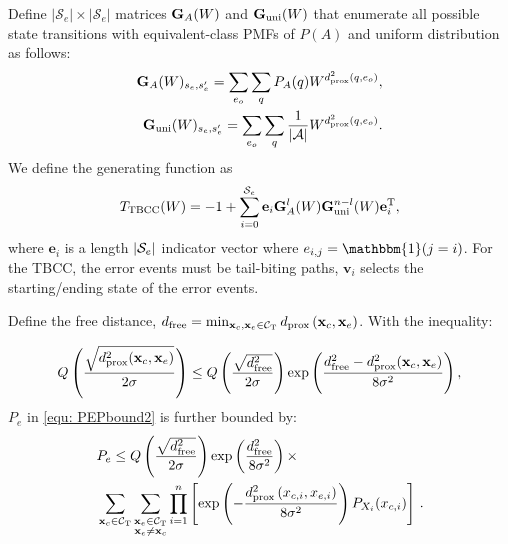 \documentclass [PhD] {uclathes}
\begin{document}
Define $|\mathcal{S}_e|\times|\mathcal{S}_e|$ matrices $\mathbf{G}_A(W)$ and $\mathbf{G}_{\text{uni}}(W)$ that enumerate all possible state transitions with equivalent-class PMFs of  $P(A)$ and uniform distribution as follows:
\begin{align}
    \mathbf{G}_{{A}}(W)_{s_e, s'_e} = \sum_{e_o} \sum_{{q}} P_{{A}}(q) W^{d_{\mathrm{prox}}^2({q}, e_o)}, \\ \mathbf{G}_{\text{uni}}(W)_{s_e, s'_e} = \sum_{e_o} \sum_{{q}} \frac{1}{|\mathcal{A}|} W^{d_{\mathrm{prox}}^2({q}, e_o)}.
\end{align}
We define the generating function as 
\begin{align}
T_{\mathrm{TBCC}}(W) = -1 +
    \sum_{i=0}^{\mathcal{S}_e}
    \mathbf{e}_i
    \mathbf{G}_A^{l}(W)\mathbf{G}_{\text{uni}}^{n-l}(W)
    \mathbf{e}_i^{\mathrm{T}},
\end{align} 
where $\mathbf{e}_i$ is a length $|\mathcal{S}_e|$ indicator vector where ${e}_{i,j}=\mathbbm{1}(j=i)$. For the TBCC, the error events must be tail-biting paths, $\mathbf{v}_i$ selects the starting/ending state of the error events.

Define the free distance, $d_{\mathrm{free}} = \min_{\mathbf{x}_{c},\mathbf{x}_{e} \in \mathcal{C}_{\mathrm{T}}} d_{\mathrm{prox}} \left(\mathbf{x}_{c}, \mathbf{x}_{e}\right)$. With the inequality:

\begin{align}\label{equ: inequality}
\begin{split}
Q\left(\frac{\sqrt{d_{\mathrm{prox}}^2{(\mathbf{x}_{c},\mathbf{x}_{e})}}}{2\sigma}\right)\leq Q\left(\frac{\sqrt{d_{\mathrm{free}}^2}}{2\sigma}\right)\exp\left(\frac{d_{\mathrm{free}}^2-d_{\mathrm{prox}}^2{(\mathbf{x}_{c},\mathbf{x}_{e})} }{8\sigma^2}\right),
\end{split}
\end{align}
$P_e$ in \eqref{equ: PEPbound2} is further bounded by:
\begin{align}
\begin{split}
    \label{equ:Qapprox}
    &P_e \leq Q\left(\frac{\sqrt{d_{\mathrm{free}}^2}}{2\sigma}\right) \exp\left(\frac{d_{\mathrm{free}}^2}{8\sigma^2}\right)\times\\&\sum_{\mathbf{x}_c\in\mathcal{C}_{\mathrm{T}}}\sum_{\substack{\mathbf{x}_e\in\mathcal{C}_{\mathrm{T}}\\\mathbf{x}_e\neq\mathbf{x}_c}}\prod_{i=1}^{n} \left[\exp\left(-\frac{d_{\mathrm{prox}}^2\left( x_{c,i}, x_{e,i} \right)}{8\sigma^2}\right)P_{X_i}(x_{c,i})\right]\,.
\end{split}
\end{align}
\end{document}
